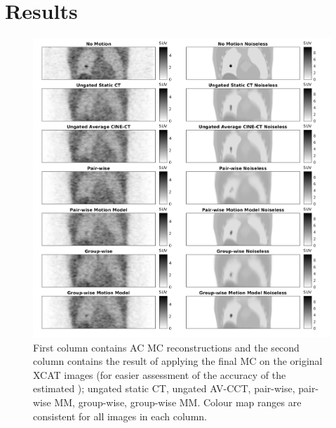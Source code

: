 \section{Results} \label{sec:results}
    \begin{figure}
        
        \centering
        
        \includegraphics[width=1.0\linewidth]{figures/visual_analysis.png}
        
        
        \captionsetup{singlelinecheck=false, justification=centering}
        \caption{First column contains \gls{AC} \gls{MC} reconstructions and the second column contains the result of applying the final \gls{MC} on the original XCAT images (for easier assessment of the accuracy of the estimated ); ungated static \gls{CT}, ungated \gls{AV-CCT}, pair-wise, pair-wise \gls{MM}, group-wise, group-wise \gls{MM}. Colour map ranges are consistent for all images in each column.}
        
        \label{fig:visual_analysis}
        
    \end{figure}
    
